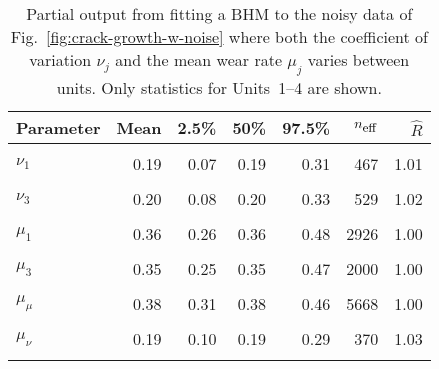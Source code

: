 \begin{table}
\centering
\caption{\label{tab:pp_both}Partial output from fitting a BHM to the noisy data of Fig.~\ref{fig:crack-growth-w-noise} where both the coefficient of variation $\nu_j$ and the mean wear rate $\mu_j$ varies between units. Only statistics for Units~1--4 are shown.}
\centering
\begin{tabular}[t]{lrrrrrr}
\toprule
Parameter & Mean & 2.5\% & 50\% & 97.5\% & $n_{\small{\mbox{eff}}}$ & $\hat{R}$\\
\midrule
\cellcolor{gray!10}{$\sigma$} & \cellcolor{gray!10}{0.03} & \cellcolor{gray!10}{0.02} & \cellcolor{gray!10}{0.03} & \cellcolor{gray!10}{0.04} & \cellcolor{gray!10}{1005} & \cellcolor{gray!10}{1.01}\\
$\nu_1$ & 0.19 & 0.07 & 0.19 & 0.31 & 467 & 1.01\\
\cellcolor{gray!10}{$\nu_2$} & \cellcolor{gray!10}{0.20} & \cellcolor{gray!10}{0.10} & \cellcolor{gray!10}{0.19} & \cellcolor{gray!10}{0.32} & \cellcolor{gray!10}{508} & \cellcolor{gray!10}{1.02}\\
$\nu_3$ & 0.20 & 0.08 & 0.20 & 0.33 & 529 & 1.02\\
\cellcolor{gray!10}{$\nu_4$} & \cellcolor{gray!10}{0.20} & \cellcolor{gray!10}{0.08} & \cellcolor{gray!10}{0.19} & \cellcolor{gray!10}{0.33} & \cellcolor{gray!10}{493} & \cellcolor{gray!10}{1.02}\\
\addlinespace
$\mu_1$ & 0.36 & 0.26 & 0.36 & 0.48 & 2926 & 1.00\\
\cellcolor{gray!10}{$\mu_2$} & \cellcolor{gray!10}{0.42} & \cellcolor{gray!10}{0.32} & \cellcolor{gray!10}{0.41} & \cellcolor{gray!10}{0.57} & \cellcolor{gray!10}{1049} & \cellcolor{gray!10}{1.01}\\
$\mu_3$ & 0.35 & 0.25 & 0.35 & 0.47 & 2000 & 1.00\\
\cellcolor{gray!10}{$\mu_4$} & \cellcolor{gray!10}{0.34} & \cellcolor{gray!10}{0.23} & \cellcolor{gray!10}{0.34} & \cellcolor{gray!10}{0.47} & \cellcolor{gray!10}{1532} & \cellcolor{gray!10}{1.01}\\
$\mu_\mu$ & 0.38 & 0.31 & 0.38 & 0.46 & 5668 & 1.00\\
\addlinespace
\cellcolor{gray!10}{$\sigma_\mu$} & \cellcolor{gray!10}{0.07} & \cellcolor{gray!10}{0.01} & \cellcolor{gray!10}{0.06} & \cellcolor{gray!10}{0.17} & \cellcolor{gray!10}{321} & \cellcolor{gray!10}{1.02}\\
$\mu_\nu$ & 0.19 & 0.10 & 0.19 & 0.29 & 370 & 1.03\\
\cellcolor{gray!10}{$\sigma_\nu$} & \cellcolor{gray!10}{0.04} & \cellcolor{gray!10}{0.00} & \cellcolor{gray!10}{0.03} & \cellcolor{gray!10}{0.11} & \cellcolor{gray!10}{329} & \cellcolor{gray!10}{1.02}\\
\bottomrule
\end{tabular}
\end{table}
